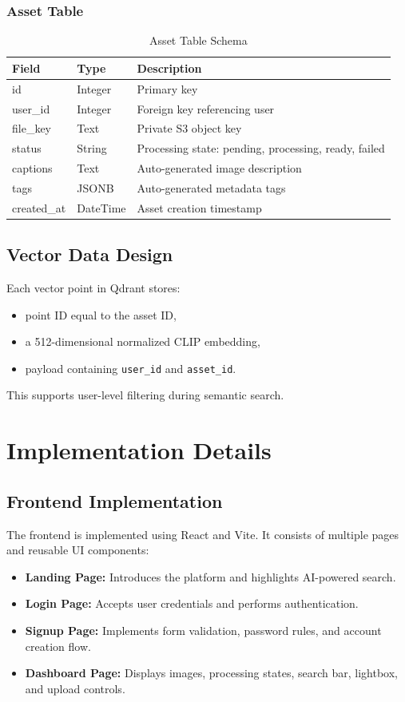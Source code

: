 \documentclass[12pt,a4paper]{report}
\begin{document}
\subsection{Asset Table}
\begin{table}[H]
\centering
\caption{Asset Table Schema}
\begin{tabularx}{\textwidth}{|l|l|X|}
\hline
\textbf{Field} & \textbf{Type} & \textbf{Description} \\
\hline
id & Integer & Primary key \\
\hline
user\_id & Integer & Foreign key referencing user \\
\hline
file\_key & Text & Private S3 object key \\
\hline
status & String & Processing state: pending, processing, ready, failed \\
\hline
captions & Text & Auto-generated image description \\
\hline
tags & JSONB & Auto-generated metadata tags \\
\hline
created\_at & DateTime & Asset creation timestamp \\
\hline
\end{tabularx}
\end{table}

\section{Vector Data Design}
Each vector point in Qdrant stores:
\begin{itemize}[leftmargin=*]
    \item point ID equal to the asset ID,
    \item a 512-dimensional normalized CLIP embedding,
    \item payload containing \texttt{user\_id} and \texttt{asset\_id}.
\end{itemize}
This supports user-level filtering during semantic search.

\chapter{Implementation Details}
\section{Frontend Implementation}
The frontend is implemented using React and Vite. It consists of multiple pages and reusable UI components:
\begin{itemize}[leftmargin=*]
    \item \textbf{Landing Page:} Introduces the platform and highlights AI-powered search.
    \item \textbf{Login Page:} Accepts user credentials and performs authentication.
    \item \textbf{Signup Page:} Implements form validation, password rules, and account creation flow.
    \item \textbf{Dashboard Page:} Displays images, processing states, search bar, lightbox, and upload controls.
\end{itemize}
\end{document}
